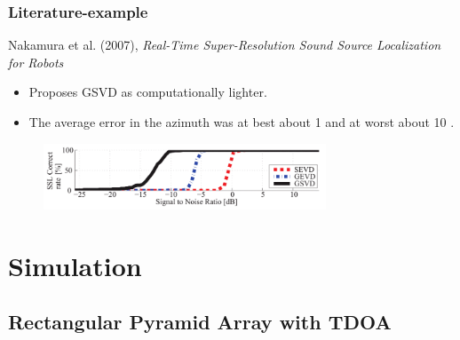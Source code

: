 \documentclass{beamer}
\begin{document}
\begin{frame}
\frametitle{Literature-example}

Nakamura et al. (2007), \textit{Real-Time Super-Resolution Sound Source Localization for Robots} \cite{nakamura_real-time_2012}

\begin{itemize}
	\item Proposes GSVD as computationally lighter.
	\item The average error in the azimuth was at best about 1 \si{\deg} and at worst about 10 \si{\deg}. 
\end{itemize}

\begin{figure}[H]
\includegraphics[width=0.75\textwidth]{./nakamura_2012/rate_SNR.png}
\centering
\end{figure}
\cite{nakamura_real-time_2012}

\end{frame}

\section{Simulation}

\subsection{Rectangular Pyramid Array with TDOA}
\end{document}
